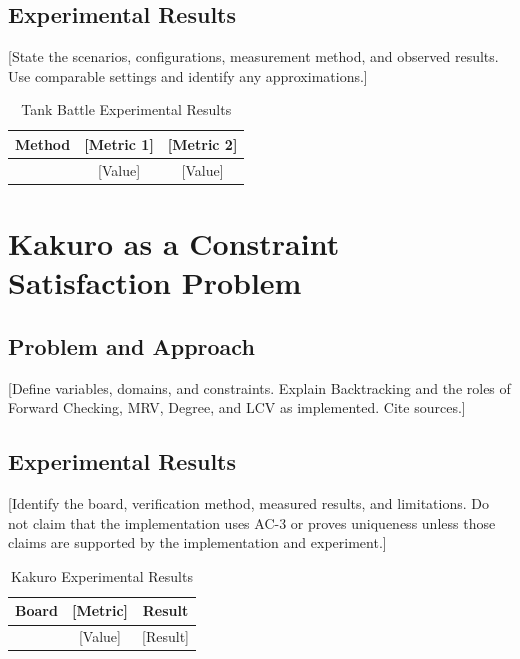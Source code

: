 \documentclass[conference]{IEEEtran}
\begin{document}
\subsection{Experimental Results}
[State the scenarios, configurations, measurement method, and observed
    results. Use comparable settings and identify any approximations.]

\begin{table}[htbp]
    \caption{Tank Battle Experimental Results}
    \label{tab:tank}
    \centering
    \begin{tabular}{lcc}
        \hline
        Method   & [Metric 1] & [Metric 2] \\
        \hline
        [Method] & [Value]    & [Value]    \\
        \hline
    \end{tabular}
\end{table}

\section{Kakuro as a Constraint Satisfaction Problem}
\subsection{Problem and Approach}
[Define variables, domains, and constraints. Explain Backtracking and the
    roles of Forward Checking, MRV, Degree, and LCV as implemented. Cite sources.]

\subsection{Experimental Results}
[Identify the board, verification method, measured results, and limitations.
    Do not claim that the implementation uses AC-3 or proves uniqueness unless
    those claims are supported by the implementation and experiment.]

\begin{table}[htbp]
    \caption{Kakuro Experimental Results}
    \label{tab:kakuro}
    \centering
    \begin{tabular}{lcc}
        \hline
        Board   & [Metric] & Result   \\
        \hline
        [Board] & [Value]  & [Result] \\
        \hline
    \end{tabular}
\end{table}

\end{document}

